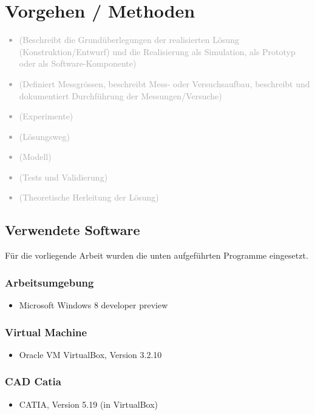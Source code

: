 \chapter{Vorgehen / Methoden}
\label{sec:VorgehenMethoden}

\textcolor{darkgray}{
  \begin{itemize}
  \item (Beschreibt die Grundüberlegungen der realisierten Lösung (Konstruktion/Entwurf) und die Realisierung als Simulation, als Prototyp oder als Software-Komponente)
  \item (Definiert Messgrössen, beschreibt Mess- oder Versuchsaufbau, beschreibt und dokumentiert Durchführung der Messungen/Versuche)
  \item (Experimente)
  \item (Lösungsweg)
  \item (Modell)
  \item (Tests und Validierung)
  \item (Theoretische Herleitung der Lösung)
  \end{itemize}
}

\section{Verwendete Software}
\label{sec:VerwendeteSoftware}
Für die vorliegende Arbeit wurden die unten aufgeführten Programme eingesetzt.

\subsection*{Arbeitsumgebung}\label{wintool}
\begin{itemize}
	\item Microsoft Windows 8 developer preview
\end{itemize}

\subsection*{Virtual Machine}\label{vm}
\begin{itemize}
	\item Oracle VM VirtualBox, Version 3.2.10
\end{itemize}

\subsection*{CAD Catia}\label{catia}
\begin{itemize}
	\item CATIA, Version 5.19 (in VirtualBox)
\end{itemize}

